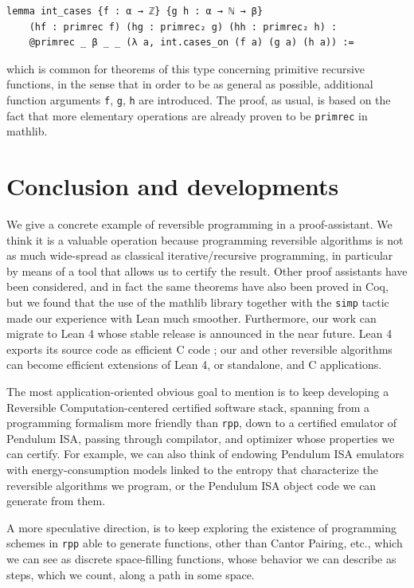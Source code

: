 \documentclass[preprint]{elsarticle}
\theoremstyle{remark}
\newcommand{\CPP}{\textsf{C}\xspace}
\newcommand{\MATHLIB}{\textsf{mathlib}\xspace}
\newcommand{\LEAN}{\textsf{Lean}\xspace}
\newcommand{\COQ}{\textsf{Coq}\xspace}
\newcommand{\LEANFour}{\textsf{Lean 4}\xspace}
\newcommand{\PISA}{\textsf{Pendulum ISA}\xspace}
\begin{document}
\begin{lstlisting}
lemma int_cases {f : α → ℤ} {g h : α → ℕ → β}
    (hf : primrec f) (hg : primrec₂ g) (hh : primrec₂ h) :
    @primrec _ β _ _ (λ a, int.cases_on (f a) (g a) (h a)) :=
\end{lstlisting}

which is common for theorems of this type concerning primitive recursive functions, in the sense that in order to be as general as possible, additional function arguments \lstinline{f}, \lstinline{g}, \lstinline{h} are introduced. The proof, as usual, is based on the fact that more elementary operations are already proven to be \lstinline|primrec| in \MATHLIB.

\section{Conclusion and developments}
\label{section:Conclusion and developments}
We give a concrete example of reversible programming in a proof-assistant. We think it is a valuable operation because programming reversible algorithms is not as much wide-spread as classical iterative/recursive programming, in particular by means of a tool that allows us to certify the result.
Other proof assistants have been considered, and in fact the same theorems have also been proved in \COQ, but we found that the use of the \MATHLIB library together with the \lstinline|simp| tactic made our experience with \LEAN much smoother.
Furthermore, our work can migrate to \LEANFour whose stable release is announced in the near future. \LEANFour exports its source code as efficient \CPP code \cite{2021-LEAN4-MouraUllrich}; our and other reversible algorithms can become efficient extensions of \LEANFour, or standalone, and \CPP applications.

The most application-oriented obvious goal to mention is to keep developing a Reversible Computa\-tion-centered certified software stack, spanning from a programming formalism more friendly than \lstinline|rpp|, down to a certified emulator of \PISA, passing through compilator, and optimizer whose properties we can certify. For example, we can also think of endowing \PISA emulators with energy-consumption models linked to the entropy that characterize the reversible algorithms we program, or the \PISA object code we can generate from them.

A more speculative direction, is to keep exploring the existence of programming schemes in \lstinline|rpp| able to generate functions, other than Cantor Pairing, etc., which we can see as discrete space-filling functions, whose behavior we can describe as steps, which we count, along a path in some space.




\end{document}
